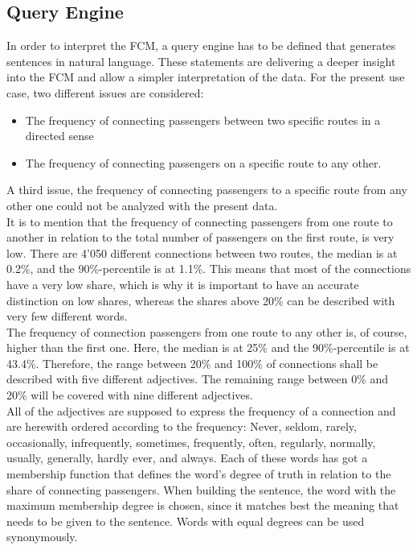 \documentclass[conference]{IEEEtran}
\begin{document}
\subsection{Query Engine}
In order to interpret the FCM, a query engine has to be defined that generates sentences in natural language. These statements are delivering a deeper insight into the FCM and allow a simpler interpretation of the data. For the present use case, two different issues are considered: 
\begin{itemize}
\item The frequency of connecting passengers between two specific routes in a directed sense
\item The frequency of connecting passengers on a specific route to any other.
\end{itemize}
A third issue, the frequency of connecting passengers to a specific route from any other one could not be analyzed with the present data.\\
It is to mention that the frequency of connecting passengers from one route to another in relation to the total number of passengers on the first route, is very low. There are 4'050 different connections between two routes, the median is at 0.2\%, and the 90\%-percentile is at 1.1\%. This means that most of the connections have a very low share, which is why it is important to have an accurate distinction on low shares, whereas the shares above 20\% can be described with very few different words.\\
The frequency of connection passengers from one route to any other is, of course, higher than the first one. Here, the median is at 25\% and the 90\%-percentile is at 43.4\%. Therefore, the range between 20\% and 100\% of connections shall be described with five different adjectives. The remaining range between 0\% and 20\% will be covered with nine different adjectives.\\
All of the adjectives are supposed to express the frequency of a connection and are herewith ordered according to the frequency: Never, seldom, rarely, occasionally, infrequently, sometimes, frequently, often, regularly, normally, usually, generally, hardly ever, and always. Each of these words has got a membership function that defines the word's degree of truth in relation to the share of connecting passengers. When building the sentence, the word with the maximum membership degree is chosen, since it matches best the meaning that needs to be given to the sentence. Words with equal degrees can be used synonymously.\\
\end{document}
